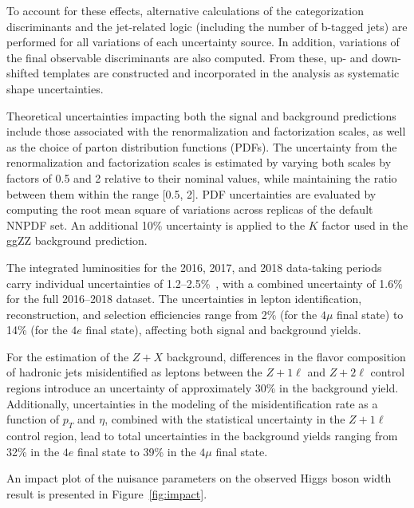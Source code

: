 To account for these effects, alternative calculations of the categorization discriminants and the jet-related logic (including the number of b-tagged jets) are performed for all variations of each uncertainty source. In addition, variations of the final observable discriminants are also computed. From these, up- and down-shifted templates are constructed and incorporated in the analysis as systematic shape uncertainties.

Theoretical uncertainties impacting both the signal and background predictions include those associated with the renormalization and factorization scales, as well as the choice of parton distribution functions (PDFs). The uncertainty from the renormalization and factorization scales is estimated by varying both scales by factors of 0.5 and 2 relative to their nominal values, while maintaining the ratio between them within the range [0.5, 2]. PDF uncertainties are evaluated by computing the root mean square of variations across replicas of the default NNPDF set. An additional 10\% uncertainty is applied to the $K$ factor used in the ggZZ background prediction.

The integrated luminosities for the 2016, 2017, and 2018 data-taking periods carry individual uncertainties of 1.2--2.5\%~\cite{CMS-LUM-17-003,CMS-PAS-LUM-17-004,CMS-PAS-LUM-18-002}, with a combined uncertainty of 1.6\% for the full 2016--2018 dataset. The uncertainties in lepton identification, reconstruction, and selection efficiencies range from 2\% (for the $4\mu$ final state) to 14\% (for the $4e$ final state), affecting both signal and background yields.

For the estimation of the $Z + X$ background, differences in the flavor composition of hadronic jets misidentified as leptons between the $Z + 1\ell$ and $Z + 2\ell$ control regions introduce an uncertainty of approximately 30\% in the background yield. Additionally, uncertainties in the modeling of the misidentification rate as a function of $p_T$ and $\eta$, combined with the statistical uncertainty in the $Z + 1\ell$ control region, lead to total uncertainties in the background yields ranging from 32\% in the $4e$ final state to 39\% in the $4\mu$ final state.

An impact plot of the nuisance parameters on the observed Higgs boson width result is presented in Figure~\ref{fig:impact}.


